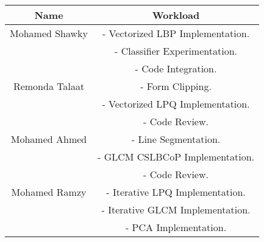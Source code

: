 \begin{center}
\begin{tabular}{||c |c ||} 
 \hline
 Name & Workload \\ [0.5ex] 
 \hline\hline
  Mohamed Shawky & - Vectorized LBP Implementation. \\
  & - Classifier Experimentation. \\
  & - Code Integration. \\
 \hline
 Remonda Talaat & - Form Clipping. \\
 & - Vectorized LPQ Implementation. \\
 & - Code Review. \\
  \hline
 Mohamed Ahmed & - Line Segmentation. \\
 & - GLCM CSLBCoP Implementation. \\
 & - Code Review. \\
 \hline
 Mohamed Ramzy & - Iterative LPQ Implementation. \\ 
 & - Iterative GLCM Implementation. \\
 & - PCA Implementation. \\ [1ex] 
 \hline
\end{tabular}
\end{center}